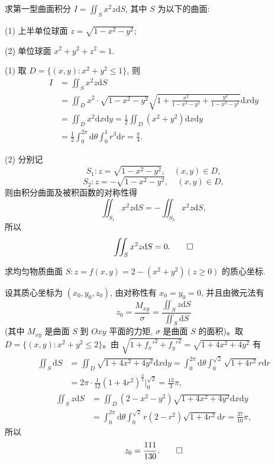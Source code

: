 \begin{example}\label{example:ma-16-3-3}
求第一型曲面积分 $I=\iint_S x^2z\mathrm dS$, 其中 $S$ 为以下的曲面:

(1) 上半单位球面 $z=\sqrt{1-x^2-y^2}$;

(2) 单位球面 $x^2+y^2+z^2=1$.
\end{example}


\begin{solve}
(1) 取 $D=\{(x,y):x^2+y^2\leqslant1\}$, 则
\[
\begin{aligned}
  I&=\iint_S x^2z\mathrm dS\\
  &=\iint_D x^2\cdot\sqrt{1-x^2-y^2}
    \sqrt{1+\frac{x^2}{1-x^2-y^2}+\frac{y^2}{1-x^2-y^2}}\mathrm dx\mathrm dy\\
  &=\iint_D x^2\mathrm dx\mathrm dy
    =\frac12\iint_D(x^2+y^2)\mathrm dx\mathrm dy\\
  &=\frac12\int_0^{2\pi}\mathrm d\theta\int_0^1r^3\mathrm dr=\frac\pi4.
\end{aligned}
\]

(2) 分别记
\[
  S_1:z=\sqrt{1-x^2-y^2},\quad (x,y)\in D,
\]
\[
  S_2:z=-\sqrt{1-x^2-y^2},\quad (x,y)\in D,
\]
则由积分曲面及被积函数的对称性得
\[
  \iint_{S_1}x^2z\mathrm dS=-\iint_{S_2}x^2z\mathrm dS,
\]
所以
\[
  \iint_S x^2z\mathrm dS=0.
\qedhere
\]
\end{solve}


\begin{example}\label{example:ma-16-3-4}
求均匀物质曲面 $S:z=f(x,y)=2-(x^2+y^2)(z\geqslant0)$ 的质心坐标.
\end{example}


\begin{solve}
设其质心坐标为 $(x_0,y_0,z_0)$, 由对称性有 $x_0=y_0=0$, 并且由微元法有
\[
  z_0=\frac{M_{xy}}{\sigma}=\frac{\iint_S z\mathrm dS}{\iint_S\mathrm dS}
\]
(其中 $M_{xy}$ 是曲面 $S$ 到 $Oxy$ 平面的力矩, $\sigma$ 是曲面 $S$ 的面积)。取 $D=\{(x,y):x^2+y^2\leqslant2\}$。由 $\sqrt{1+f_x'^2+f_y'^2}=\sqrt{1+4x^2+4y^2}$ 有
\[
\begin{aligned}
  \iint_S\mathrm dS
  &=\iint_D\sqrt{1+4x^2+4y^2}\mathrm dx\mathrm dy
    =\int_0^{2\pi}\mathrm d\theta\int_0^{\sqrt2}\sqrt{1+4r^2}r\mathrm dr\\
  &=2\pi\cdot\frac1{12}(1+4r^2)^{\frac32}\bigg|_0^{\sqrt2}
    =\frac{13}3\pi,
\end{aligned}
\]
\[
\begin{aligned}
  \iint_S z\mathrm dS
  &=\iint_D(2-x^2-y^2)\sqrt{1+4x^2+4y^2}\mathrm dx\mathrm dy\\
  &=\int_0^{2\pi}\mathrm d\theta\int_0^{\sqrt2}r(2-r^2)\sqrt{1+4r^2}\mathrm dr
    =\frac{37}{10}\pi,
\end{aligned}
\]
所以
\[
  z_0=\frac{111}{130}.
\qedhere
\]
\end{solve}


